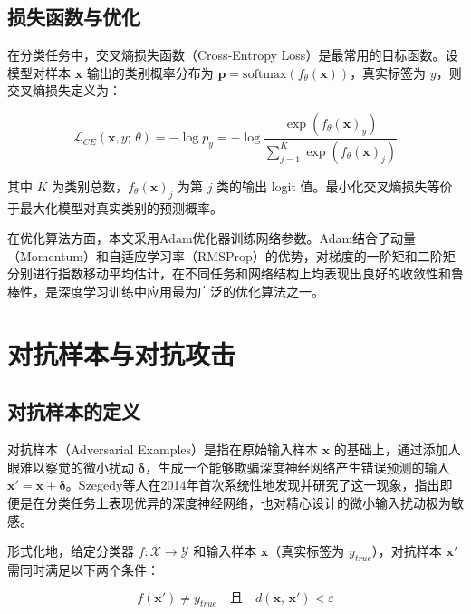 \subsection{损失函数与优化}

在分类任务中，交叉熵损失函数（Cross-Entropy Loss）是最常用的目标函数。设模型对样本 $\mathbf{x}$ 输出的类别概率分布为 $\mathbf{p} = \text{softmax}(f_\theta(\mathbf{x}))$，真实标签为 $y$，则交叉熵损失定义为：

\begin{equation}
  \mathcal{L}_{CE}(\mathbf{x}, y;\, \theta) = -\log p_y = -\log \frac{\exp\!\left(f_\theta(\mathbf{x})_y\right)}{\displaystyle\sum_{j=1}^{K} \exp\!\left(f_\theta(\mathbf{x})_j\right)}
\end{equation}

其中 $K$ 为类别总数，$f_\theta(\mathbf{x})_j$ 为第 $j$ 类的输出 logit 值。最小化交叉熵损失等价于最大化模型对真实类别的预测概率。

在优化算法方面，本文采用Adam优化器\cite{kingma2015adam}训练网络参数。Adam结合了动量（Momentum）和自适应学习率（RMSProp）的优势，对梯度的一阶矩和二阶矩分别进行指数移动平均估计，在不同任务和网络结构上均表现出良好的收敛性和鲁棒性，是深度学习训练中应用最为广泛的优化算法之一。

\section{对抗样本与对抗攻击}

\subsection{对抗样本的定义}

对抗样本（Adversarial Examples）是指在原始输入样本 $\mathbf{x}$ 的基础上，通过添加人眼难以察觉的微小扰动 $\boldsymbol{\delta}$，生成一个能够欺骗深度神经网络产生错误预测的输入 $\mathbf{x}' = \mathbf{x} + \boldsymbol{\delta}$。Szegedy等人在2014年首次系统性地发现并研究了这一现象\cite{szegedy2014intriguing}，指出即便是在分类任务上表现优异的深度神经网络，也对精心设计的微小输入扰动极为敏感。

形式化地，给定分类器 $f: \mathcal{X} \to \mathcal{Y}$ 和输入样本 $\mathbf{x}$（真实标签为 $y_{true}$），对抗样本 $\mathbf{x}'$ 需同时满足以下两个条件：

\begin{equation}
  f(\mathbf{x}') \neq y_{true} \quad \text{且} \quad d(\mathbf{x},\, \mathbf{x}') < \varepsilon
\end{equation}

